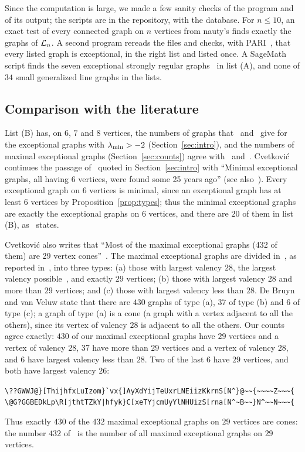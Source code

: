 Since the computation is large, we made a few sanity checks of the program and of its output;
the scripts are in the repository, with the database. For $n\le10$, an exact test of every
connected graph on $n$ vertices from nauty's  finds exactly the graphs of ${\mathcal L}_n$. A
second program rereads the files and checks, with PARI~\cite{PARI}, that every listed graph is
exceptional, in the right list and listed once. A SageMath script finds the seven exceptional
strongly regular graphs~\cite[Theorem~3.12.4]{BCN89} in list (A), and none of $34$ small
generalized line graphs in the lists.

\subsection*{Comparison with the literature}
List (B) has, on $6$, $7$ and $8$ vertices, the numbers of graphs that~\cite[\S2.3 and
Table~A2]{CRS04} and~\cite{DC79} give for the exceptional graphs with $\lambda_{\min}>-2$
(Section~\ref{sec:intro}), and the numbers of maximal exceptional graphs (Section~\ref{sec:counts}) agree
with~\cite{CLRS02} and~\cite{Cve04}. Cvetkovi\'c
continues the passage of~\cite{Cve04} quoted in Section~\ref{sec:intro} with ``Minimal
exceptional graphs, all having 6 vertices, were found some 25 years ago'' (see
also~\cite{CRS04}). Every exceptional graph on $6$ vertices is minimal, since an exceptional
graph has at least $6$ vertices by Proposition~\ref{prop:types}; thus the minimal exceptional
graphs are exactly the exceptional graphs on $6$ vertices, and there are $20$ of them in list
(B), as~\cite{Cve04} states.

Cvetkovi\'c also writes that ``Most of the maximal exceptional graphs (432 of them) are 29 vertex
cones''~\cite{Cve04}. The maximal exceptional graphs are divided in~\cite[Chapter~6]{CRS04}, as
reported in~\cite[\S3]{DBvV26}, into three types: (a) those with largest valency $28$, the
largest valency possible~\cite[Theorem~4.3]{CGSS}, and exactly $29$ vertices; (b) those with
largest valency $28$ and more than $29$ vertices; and (c) those with largest valency less than
$28$. De Bruyn and van Veluw state that there are $430$ graphs of type (a), $37$ of type (b) and
$6$ of type (c); a graph of type (a) is a cone (a graph with a vertex adjacent to all the others),
since its vertex of valency $28$ is adjacent to all the others. Our counts agree exactly: $430$ of
our maximal exceptional graphs have $29$ vertices and a vertex of valency $28$, $37$ have more
than $29$ vertices and a vertex of valency $28$, and $6$ have largest valency less than $28$. Two
of the last $6$ have $29$ vertices, and both have largest valency $26$:
\begin{center}
\small
\verb!\??GWWJ@}[ThijhfxLuIzom}`vx{]AyXdYijTeUxrLNEiizKkrnS[N^}@~~{~~~~Z~~~{!\\
\verb!\@G?GGBEDkLp\R[jthtTZkY|hfyk}C[xeTYjcmUyYlNHUizS[rna[N^~B~~}N^~~N~~~{!
\end{center}
Thus exactly $430$ of the $432$ maximal exceptional graphs on $29$ vertices are cones: the
number $432$ of~\cite{Cve04} is the number of all maximal exceptional graphs on $29$ vertices.

